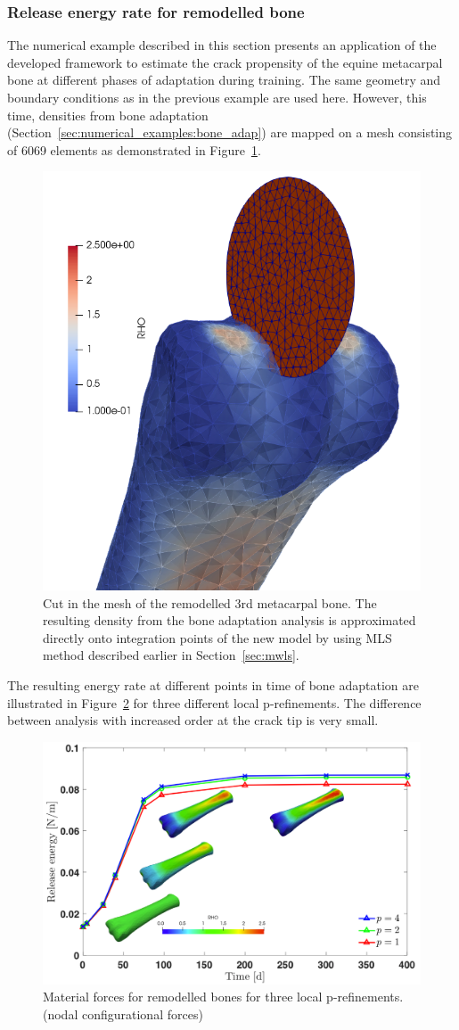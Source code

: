 \documentclass[11pt]{acmeArticle}
\numberwithin{equation}{section}
\begin{document}
\subsubsection{Release energy rate for remodelled bone}
The numerical example described in this section presents an application of the developed framework to estimate the crack propensity of the equine metacarpal bone at different phases of adaptation during training. 
The same geometry and boundary conditions as in the previous example are used here. 
However, this time, densities from bone adaptation (Section~\ref{sec:numerical_examples:bone_adap}) are mapped on a mesh consisting of 6069 elements as demonstrated in Figure~\ref{fig:frackmeshcutting}. 
\begin{figure}
	\centering
	\includegraphics[width=0.4\linewidth]{Figures/frack_mesh_cutting.png}
	\caption{Cut in the mesh of the remodelled 3rd metacarpal bone. The resulting density from the bone adaptation analysis is approximated directly onto integration points of the new model by using MLS method described earlier in Section~\ref{sec:mwls}. }
	\label{fig:frackmeshcutting}
\end{figure}
The resulting energy rate at different points in time of bone adaptation are illustrated in Figure~\ref{fig:crackmc3release} for three different local p-refinements. The difference between analysis with increased order at the crack tip is very small. 
\begin{figure}
	\centering
	\includegraphics[width=1\linewidth]{Figures/graphs/crack_mc3_release.png}
	\caption{Material forces for remodelled bones for three local p-refinements. (nodal configurational forces)}
	\label{fig:crackmc3release}
\end{figure}
\end{document}
